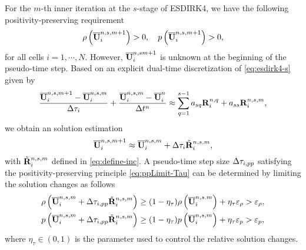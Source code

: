 For the $m$-th inner iteration at the $s$-stage of ESDIRK4, we have the following positivity-preserving requirement
\begin{equation}
    \label{eq:ppLimit-Tau}
    \rho\left(\overline{\mathbf{U}}_i^{n,s,m+1} \right)>0, \quad
    p\left(\overline{\mathbf{U}}_i^{n,s,m+1}\right)>0,
\end{equation}
for all cells $i=1,\cdots,N$. However, $\overline{\mathbf{U}}^{n,sm+1}_i$ is unknown at the beginning of the pseudo-time step. Based on an explicit dual-time  discretization of \eqref{eq:esdirk4-s} given by
\begin{equation}
    \dfrac{\overline{\mathbf{U}}^{n,s,m+1}_i-\overline{\mathbf{U}}^{n,s,m}_i}{\mathrm\Delta \tau_i} + \dfrac{\overline{\mathbf{U}}^{n,s,m}_i - \overline{\mathbf{U}}^{n}_i}{\mathrm\Delta t^n} \approx \sum_{q=1}^{s-1} a_{sq} \mathbf{R}^{n,q}_i + a_{ss} \mathbf{R}_i^{n,s,m},
\end{equation}
we obtain an solution estimation
\begin{equation}
    \label{eq:estimation-dtau}
    \overline{\mathbf{U}}_i^{n,s,m+1} \approx  \overline{\mathbf{U}}_i^{n,s,m} + \mathrm\Delta \tau_i  \tilde{\mathbf{R}}_i^{n,s,m},
\end{equation}
with $ \tilde{\mathbf{R}}_i^{n,s,m}$ defined in \eqref{eq:define-inc}.
A pseudo-time step size $ \mathrm\Delta \tau_{i,pp}$ satisfying the positivity-preserving principle \eqref{eq:ppLimit-Tau} can be determined by limiting the solution changes as follows
\begin{equation}
    \label{eq:ppLimitDtau}
    \begin{aligned}
        \rho\left(\overline{\mathbf{U}}_i^{n,s,m} +  \mathrm\Delta \tau_{i,pp} \tilde{\mathbf{R}}_i^{n,s,m}\right)
         & \geq
        (1- \eta_\tau)
        \rho\left(\overline{\mathbf{U}}_i^{n,s.m}\right)
        + \eta_\tau \varepsilon_\rho
        >\varepsilon_\rho, \\
        p\left(\overline{\mathbf{U}}_i^{n,s,m} + \mathrm\Delta  \tau_{i,pp} \tilde{\mathbf{R}}_i^{n,s,m}\right)
         & \geq
        (1- \eta_\tau)
        p\left(\overline{\mathbf{U}}_i^{n,s,m}\right)
        + \eta_\tau \varepsilon_p
        >\varepsilon_p,
    \end{aligned}
\end{equation}
where $\eta_\tau\in(0,1)$ is the parameter used to control the relative solution changes.

